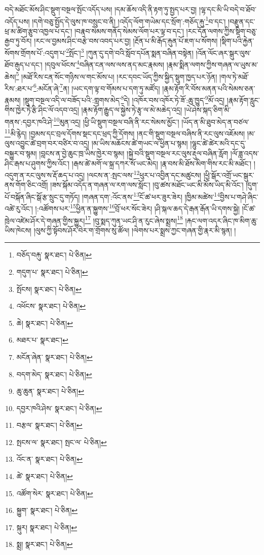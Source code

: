 བདེ་མཐོང་མོས་ཤིང་སྡུག་བསྔལ་སྤོང་འདོད་པས། །དམ་ཆོས་འདི་ནི་རྟག་ཏུ་སྤྱད་པར་བྱ། །ལྷ་དང་མི་ཡི་བདེ་བ་ཐོབ་འདོད་པས། །དགེ་བཅུ་སྤྱོད་དེ་ལུས་ཁ་བསྲུང་བ་ནི། །འདོད་ལོག་གཡེམ་དང་སྲོག་:གཅོད་རྐུ་\footnote{བཅོད་བརྐུ་  སྣར་ཐང་།  པེ་ཅིན། }བ་དང་། །བརྫུན་དང་ཕྲ་མ་ཚིག་རྩུབ་འཁྱལ་པ་དང་། །བརྣབ་སེམས་གནོད་སེམས་ལོག་པར་ལྟ་བ་དང་། །རང་དོན་ལགས་ཀྱིས་སྡིག་བཅུ་རྒྱབ་ཏུ་བོར། །རང་ལ་བྱམས་ཤིང་བརྩེ་བས་འབད་པར་བྱ། །རྔོན་པ་མི་རྒོད་རྐུན་པོ་ཇག་པ་སོགས། །སྡིག་པའི་རྐྱེན་སོགས་གྲོགས་པོ་:འདུག་པ་\footnote{གདུག་པ་  སྣར་ཐང་།  པེ་ཅིན། }སྤོང་།\footnote{སྤོངས།  སྣར་ཐང་།  པེ་ཅིན། } །ཀུན་དུ་དགེ་བའི་སློབ་དཔོན་སྨན་བཞིན་བསྟེན། །འོན་ལོང་ཞར་སྒུར་ལུས་ཐོབ་རྒུད་པ་དང་། །དབུལ་ཕོངས་\footnote{འཕོངས་  སྣར་ཐང་།  པེ་ཅིན། }བཞིན་ངན་ལས་ལས་ནད་མང་རྣམས། །རྣམ་སྨིན་ལགས་ཀྱིས་གཞན་ལ་ཡུས་མ་ཆེས།\footnote{ཆེ།  སྣར་ཐང་།  པེ་ཅིན། } །མཐོ་རིས་ངན་སོང་གཉིས་ལ་གང་མོས་པ། །རང་དབང་ཡོད་ཀྱིས་སྐྱིད་སྡུག་ཁྱད་པར་ཉོན། །གལ་ཏེ་མཐོ་རིས་:ཐར་པ་\footnote{མཐར་པ་  སྣར་ཐང་། }:མངོན་ཞེ་\footnote{མངོན་ཞེན་  སྣར་ཐང་།  པེ་ཅིན། }ན། །ཡང་དག་ལྟ་བ་གོམས་པ་དག་ཏུ་མཛོད། །རྣམ་རྟོག་རི་བོས་མནན་པའི་སེམས་ཅན་རྣམས། །སྡུག་བསྔལ་འདི་ལ་བཟོད་པའི་:གླགས་མེད་\footnote{བདག་མེད་  སྣར་ཐང་།  པེ་ཅིན། }དེ། །འཁོར་བས་འཁོར་ཏེ་ཟོ་:ཆུ་ཁྱུད་\footnote{ཆུ་ཆུན་  སྣར་ཐང་།  པེ་ཅིན། }མོ་འདྲ། །རྣམ་རྟོག་རླུང་གིས་ཁྱེར་ཏེ་རྩི་ཤིང་ལོ་འདབ་འདྲ། །རྣམ་རྟོག་རྒྱུད་ལ་སྐྱེས་ཏེ་རྩྭ་ལ་མེ་མཆེད་འདྲ། །ཡེ་ཤེས་སྐད་ཅིག་མི་གནས་:དབྱར་ཁའི་ཤེ་\footnote{དབྱར་ཁའི་ཤེས་  སྣར་ཐང་།  པེ་ཅིན། }མུན་འདྲ། །ཕྱི་ཡི་སྡུག་བསྔལ་བཞི་ནི་རང་སེམས་མྱོང་། །ཡོད་ན་མི་ཐུབ་མེད་ན་བཙལ་\footnote{བརྩལ་  སྣར་ཐང་།  པེ་ཅིན། }མི་རྙེད། །བྱམས་དང་བྲལ་དོགས་སྡང་དང་ཕྲད་ཀྱི་དོགས། །ནང་གི་སྡུག་བསྔལ་བཞིས་ནི་རང་ལུས་འཇོམས། །མ་ལུས་འབྱུང་ཚེ་བྲག་བར་བཙིར་བ་འདྲ། །མ་ཡིས་མཆོངས་ཚེ་གཡང་ལ་ཕྱིན་པ་སྙམ། །ལྷུང་ཚེ་ཚེར་མའི་དང་དུ་བསྐྱུར་བ་སྙམ། །བླངས་ན་བྱེ་ཆུང་ཁྲ་ཡིས་ཁྱེར་བ་སྙམ། །སྐྱེ་བའི་སྡུག་བསྔལ་རང་ལུས་རྡུལ་བཞིན་རློག །ལོ་ཟླ་འདས་ཤིང་རྒས་པ་ཤུགས་ཀྱིས་འོང་། །རྒས་ཚེ་མགོ་ལ་སྐྲ་དཀར་སོ་ཡང་མེད། །རྣ་བས་མི་ཐོས་མིག་གིས་རང་མི་མཐོང་། །འདུག་ན་རང་ལུས་ས་རྡོ་ཆད་པ་འདྲ། །ལངས་ན་:སྤང་ལས་\footnote{སྤངས་ལ་  སྣར་ཐང་། སྤང་ལ་  པེ་ཅིན། }ཕུར་པ་འབྱིན་དང་མཚུངས། །ཕྱི་སྒོར་འགྲོ་ཡང་སྒུར་ནས་གོག་ཅིང་འགྲོ། །ཟས་སྐོམ་འདོད་ན་གཞན་ལ་རག་ལས་སློང་། །བུ་ཚས་མཐོང་ཡང་མི་མོས་ཡིད་མི་འོང་། །དུག་པོ་བསྐོན་ཞིང་སྒོ་རྩ་སྲུང་དུ་གཏོད། །གཞན་དག་:འོང་ནས་\footnote{འོང་ན་  སྣར་ཐང་།  པེ་ཅིན། }ངོ་ཚ་ཕར་ཟུར་ཟེར། །ཁྱིམ་མཚེས་\footnote{ཚེ་  སྣར་ཐང་།  པེ་ཅིན། }བྱིས་པ་གཤེ་ཞིང་འཚེ་རུ་འོང་། །:འཚོགས་པར་\footnote{འཚོག་སེར་  སྣར་ཐང་།  པེ་ཅིན། }ཕྱིན་ན་སྐྱུགས་\footnote{སྐྱུག་  སྣར་ཐང་།  པེ་ཅིན། }བྲོ་ཕར་སོང་ཟེར། །ཤི་སྐལ་ཆད་དེ་རྒན་རྒོན་ཡི་དགས་སྐྱེ། །ངོ་ཚ་ཁྲེལ་འཛེམ་ཤོར་དེ་གཞན་གྱིས་སྐྱུར།\footnote{སྐུར།  སྣར་ཐང་།  པེ་ཅིན། } །བུ་སྨད་ཀུན་ཡང་ཤི་ན་རུང་ཞེས་སྨྲས།\footnote{སྨྲ།  སྣར་ཐང་།  པེ་ཅིན། } །རྐང་ལག་འདར་ཞིང་ཁ་མིག་ཆུ་ཡིས་ཁེངས། །ལུས་ཀྱི་སྟོབས་ཤོར་བེར་ག་གྲོགས་སུ་ཚོལ། །ལེགས་པར་སྨྲས་ཀྱང་གཞན་གྱི་རྣར་མི་སྙན། །
